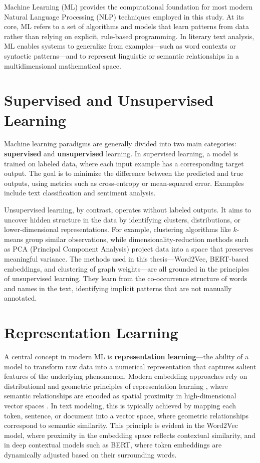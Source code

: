 \documentclass[a4paper,12pt]{report}
\begin{document}
Machine Learning (ML) provides the computational foundation for most modern Natural Language Processing (NLP) techniques employed in this study. 
At its core, ML refers to a set of algorithms and models that learn patterns from data rather than relying on explicit, rule-based programming. \cite{MITCHELL1997}
In literary text analysis, ML enables systems to generalize from examples—such as word contexts or syntactic patterns—and to represent linguistic or semantic relationships in a multidimensional mathematical space. 

\section{Supervised and Unsupervised Learning}
Machine learning paradigms are generally divided into two main categories: \textbf{supervised} and \textbf{unsupervised} learning. 
In supervised learning, a model is trained on labeled data, where each input example has a corresponding target output. \cite{VAPNIK1995}
The goal is to minimize the difference between the predicted and true outputs, using metrics such as cross-entropy or mean-squared error. \cite{HASTIE2009}
Examples include text classification and sentiment analysis.

Unsupervised learning, by contrast, operates without labeled outputs. 
It aims to uncover hidden structure in the data by identifying clusters, distributions, or lower-dimensional representations. 
For example, clustering algorithms like $k$-means group similar observations, while dimensionality-reduction methods such as PCA (Principal Component Analysis) project data into a space that preserves meaningful variance. 
The methods used in this thesis—Word2Vec, BERT-based embeddings, and clustering of graph weights—are all grounded in the principles of unsupervised learning. 
They learn from the co-occurrence structure of words and names in the text, identifying implicit patterns that are not manually annotated.\cite{MURPHY2012}

\section{Representation Learning}
A central concept in modern ML is \textbf{representation learning}—the ability of a model to transform raw data into a numerical representation that captures salient features of the underlying phenomenon. 
Modern embedding approaches rely on distributional and geometric principles of representation learning \cite{TURNEY2010}, where semantic relationships are encoded as spatial proximity in high-dimensional vector spaces \cite{HAMILTON2016Embeddings}.
In text modeling, this is typically achieved by mapping each token, sentence, or document into a vector space, where geometric relationships correspond to semantic similarity. 
This principle is evident in the Word2Vec model, where proximity in the embedding space reflects contextual similarity, and in deep contextual models such as BERT, where token embeddings are dynamically adjusted based on their surrounding words. 
\end{document}
